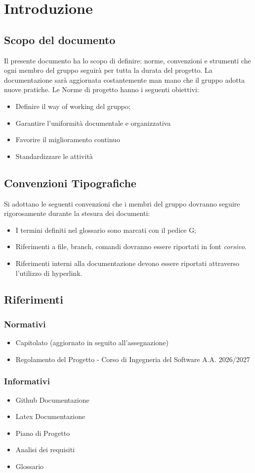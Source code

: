 \section{Introduzione}
\subsection{Scopo del documento}
Il presente documento ha lo scopo di definire: norme, convenzioni e strumenti che ogni membro del gruppo \textbf{\nomegruppo} seguirà per tutta la durata del progetto. La documentazione sarà aggiornata costantemente man mano che il gruppo adotta nuove pratiche. 
Le Norme di progetto hanno i seguenti obiettivi:
\begin{itemize}
	\item Definire il way of working del gruppo;
	\item Garantire l'uniformità documentale e organizzativa
	\item Favorire il miglioramento continuo
	\item Standardizzare le attività
\end{itemize}

\subsection{Convenzioni Tipografiche}
Si adottano le seguenti convenzioni che i membri del gruppo dovranno seguire rigorosamente durante la stesura dei documenti:
\begin{itemize}
	\item I termini definiti nel glossario sono marcati con il pedice G;
	\item Riferimenti a file, branch, comandi dovranno essere riportati in font \textit{corsivo}.
	\item Riferimenti interni alla documentazione devono essere riportati attraverso l'utilizzo di hyperlink.
\end{itemize}

\subsection{Riferimenti}
\subsubsection{Normativi}
\begin{itemize}
		\item Capitolato (aggiornato in seguito all'assegnazione)
		\item Regolamento del Progetto - Corso di Ingegneria del Software A.A. 2026/2027
\end{itemize}

\subsubsection{Informativi}
\begin{itemize}
	\item Github Documentazione
	\item Latex Documentazione
	\item Piano di Progetto
	\item Analisi dei requisiti
	\item Glossario
\end{itemize}
